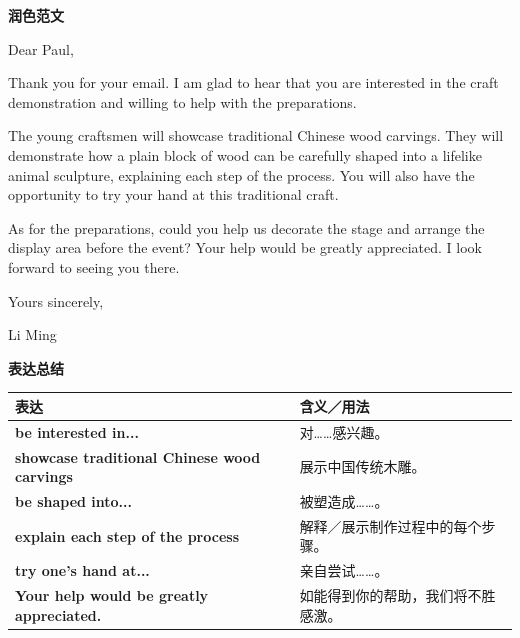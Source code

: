 \documentclass[a4paper,12pt]{article}
\newcommand{\sectionlabel}[1]{%
  \vspace{1.5mm}
  {\fontsize{11pt}{14pt}\selectfont\bfseries\color{navy}#1\par}
  \vspace{1mm}
}
\newenvironment{essaybody}{%
  \fontsize{14pt}{20pt}\selectfont
  \RaggedRight
  \setlength{\parskip}{5pt}
}{\par}
\newcommand{\expressions}[1]{%
  \sectionlabel{表达总结}
  {\fontsize{10.8pt}{13.2pt}\selectfont
  \begin{tabularx}{\textwidth}{>{\RaggedRight\arraybackslash}p{0.46\textwidth} >{\RaggedRight\arraybackslash}X}
  \toprule
  \textbf{表达} & \textbf{含义／用法}\\
  \midrule
  #1
  \bottomrule
  \end{tabularx}}
}
\newcommand{\exprow}[2]{\textbf{#1} & #2\\}
\begin{document}
\sectionlabel{润色范文}
\begin{essaybody}
Dear Paul,

Thank you for your email. I am glad to hear that you are interested in the craft demonstration and willing to help with the preparations.

The young craftsmen will showcase traditional Chinese wood carvings. They will demonstrate how a plain block of wood can be carefully shaped into a lifelike animal sculpture, explaining each step of the process. You will also have the opportunity to try your hand at this traditional craft.

As for the preparations, could you help us decorate the stage and arrange the display area before the event? Your help would be greatly appreciated. I look forward to seeing you there.

Yours sincerely,

Li Ming
\end{essaybody}

\expressions{
\exprow{be interested in...}{对……感兴趣。}
\exprow{showcase traditional Chinese wood carvings}{展示中国传统木雕。}
\exprow{be shaped into...}{被塑造成……。}
\exprow{explain each step of the process}{解释／展示制作过程中的每个步骤。}
\exprow{try one's hand at...}{亲自尝试……。}
\exprow{Your help would be greatly appreciated.}{如能得到你的帮助，我们将不胜感激。}
}
\end{document}
